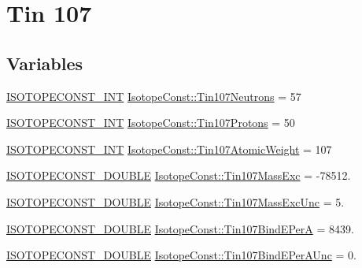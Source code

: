 \hypertarget{group___isotope_const-_tin-_sn107}{}\section{Tin 107}
\label{group___isotope_const-_tin-_sn107}
\subsection*{Variables}
\begin{DoxyCompactItemize}
\item 
\mbox{\hyperlink{group___isotope_const-_macros_ga5f18360b3e99483a35c32d789e62621c}{I\+S\+O\+T\+O\+P\+E\+C\+O\+N\+S\+T\+\_\+\+I\+NT}} \mbox{\hyperlink{group___isotope_const-_tin-_sn107_gab466beefb624da1df0fbb3c6efcacd7e}{Isotope\+Const\+::\+Tin107\+Neutrons}} = 57
\item 
\mbox{\hyperlink{group___isotope_const-_macros_ga5f18360b3e99483a35c32d789e62621c}{I\+S\+O\+T\+O\+P\+E\+C\+O\+N\+S\+T\+\_\+\+I\+NT}} \mbox{\hyperlink{group___isotope_const-_tin-_sn107_ga5e86fb7b47fc6566acba588b3c5f9159}{Isotope\+Const\+::\+Tin107\+Protons}} = 50
\item 
\mbox{\hyperlink{group___isotope_const-_macros_ga5f18360b3e99483a35c32d789e62621c}{I\+S\+O\+T\+O\+P\+E\+C\+O\+N\+S\+T\+\_\+\+I\+NT}} \mbox{\hyperlink{group___isotope_const-_tin-_sn107_ga5e077f62c49ef4d07555fb650e16436d}{Isotope\+Const\+::\+Tin107\+Atomic\+Weight}} = 107
\item 
\mbox{\hyperlink{group___isotope_const-_macros_ga8f45a7272ce02c0b4c65c44636ed719a}{I\+S\+O\+T\+O\+P\+E\+C\+O\+N\+S\+T\+\_\+\+D\+O\+U\+B\+LE}} \mbox{\hyperlink{group___isotope_const-_tin-_sn107_ga5070823e660af11d517923786f6b0800}{Isotope\+Const\+::\+Tin107\+Mass\+Exc}} = -\/78512.
\item 
\mbox{\hyperlink{group___isotope_const-_macros_ga8f45a7272ce02c0b4c65c44636ed719a}{I\+S\+O\+T\+O\+P\+E\+C\+O\+N\+S\+T\+\_\+\+D\+O\+U\+B\+LE}} \mbox{\hyperlink{group___isotope_const-_tin-_sn107_gac07a70139d8d4c63b59efaa94c54064f}{Isotope\+Const\+::\+Tin107\+Mass\+Exc\+Unc}} = 5.
\item 
\mbox{\hyperlink{group___isotope_const-_macros_ga8f45a7272ce02c0b4c65c44636ed719a}{I\+S\+O\+T\+O\+P\+E\+C\+O\+N\+S\+T\+\_\+\+D\+O\+U\+B\+LE}} \mbox{\hyperlink{group___isotope_const-_tin-_sn107_ga9439afc05a4a3c2266bbf01835087cb7}{Isotope\+Const\+::\+Tin107\+Bind\+E\+PerA}} = 8439.
\item 
\mbox{\hyperlink{group___isotope_const-_macros_ga8f45a7272ce02c0b4c65c44636ed719a}{I\+S\+O\+T\+O\+P\+E\+C\+O\+N\+S\+T\+\_\+\+D\+O\+U\+B\+LE}} \mbox{\hyperlink{group___isotope_const-_tin-_sn107_ga195b957a65fc63f40b3524390ab2a773}{Isotope\+Const\+::\+Tin107\+Bind\+E\+Per\+A\+Unc}} = 0.

\end{DoxyCompactItemize}
